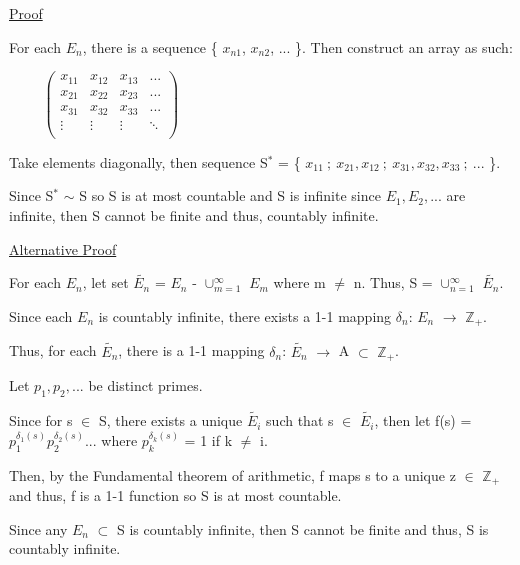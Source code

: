 { \color{magenta} \underline{Proof} } 
	
	For each $E_n$, there is a sequence \{ $x_{n1}$, $x_{n2}$, ... \}.
	Then construct an array as such:

	$ \hspace{1cm}
	\left(
	\begin{array}{cccc}
		x_{11} & x_{12} & x_{13} & ... \\
		x_{21} & x_{22} & x_{23} & ... \\
		x_{31} & x_{32} & x_{33} & ... \\
		\vdots & \vdots & \vdots & \ddots \\
	\end{array}
	\right)
	$
		
	Take elements diagonally, then sequence S$^*$ =
	\{ $x_{11} \ ; \ x_{21}, x_{12} \ ; \ x_{31}, x_{32}, x_{33} \ ; \ ... $ \}.
		
	\begin{adjustbox}{minipage=15cm, right}
		Since S$^*$ $\sim$ S so S is at most countable and S is infinite since
		$E_1, E_2, ...$ are infinite, then S cannot be finite and thus, countably infinite.
	\end{adjustbox}

{ \color{magenta} \underline{Alternative Proof} } 

	For each $E_n$, let set $\widetilde{E_n}$ = $E_n$ - $\cup_{m=1}^{\infty}$ $E_m$ where
	m $\neq$ n. Thus, S = $\cup_{n=1}^{\infty}$ $\widetilde{E_n}$.

	Since each $E_n$ is countably infinite, there exists a 1-1 mapping
	$\delta_n$: $E_n$ $\rightarrow$ $\mathbb{Z}_+$.

	Thus, for each $\widetilde{E_n}$, there is a 1-1 mapping
	$\delta_n$: $\widetilde{E_n}$ $\rightarrow$ A $\subset$ $\mathbb{Z}_+$.

	Let $p_1, p_2, ... $ be distinct primes.

	Since for s $\in$ S, there exists a unique $\widetilde{E_i}$ such that
	s $\in$ $\widetilde{E_i}$, then let f(s) = $p_1^{\delta_1(s)} p_2^{\delta_2(s)}...$
	where $p_k^{\delta_k(s)}$ = 1 if k $\neq$ i.

	Then, by the Fundamental theorem of arithmetic, f maps s to a unique z $\in$ $\mathbb{Z}_+$
	and thus, f is a 1-1 function so S is at most countable.

	Since any $E_n$ $\subset$ S is countably infinite, then S cannot be finite
	and thus, S is countably infinite. \\

